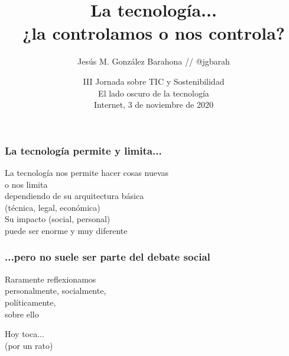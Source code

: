 \documentclass[17pt,aspectratio=169,hyperref=pdfusetitle]{beamer}
\title[¿Controlas la tecnología...?]{La tecnología... \\ ¿la controlamos o nos controla?}
\author[Jesús M. González Barahona]{\small Jesús M. González Barahona //
@jgbarah}
\institute[URJC]{Universidad Rey Juan Carlos}
\date[III Jornada TIC y sostenibilidad]{\small III Jornada sobre TIC y Sostenibilidad \\ El lado oscuro de la tecnología \\
  Internet, 3 de noviembre de 2020}
\begin{document}
\begin{frame}
  \maketitle
\end{frame}


\begin{frame}
\frametitle{La tecnología permite y limita...}

\begin{flushright}
La tecnología nos permite hacer cosas nuevas \\
o nos limita \\
dependiendo de su arquitectura básica \\
(técnica, legal, económica) \\
\vspace{.2cm}
Su impacto (social, personal) \\
puede ser enorme y muy diferente \\
\end{flushright}

\end{frame}


\begin{frame}
\frametitle{...pero no suele ser parte del debate social}

\begin{center}
{\Large
Raramente reflexionamos\\
personalmente, socialmente, \\
políticamente, \\
sobre ello \\
}
\end{center}

\end{frame}


\begin{frame}

\begin{center}
{\Huge
Hoy toca... \\
(por un rato) \\
}
\end{center}

\end{frame}
\end{document}
